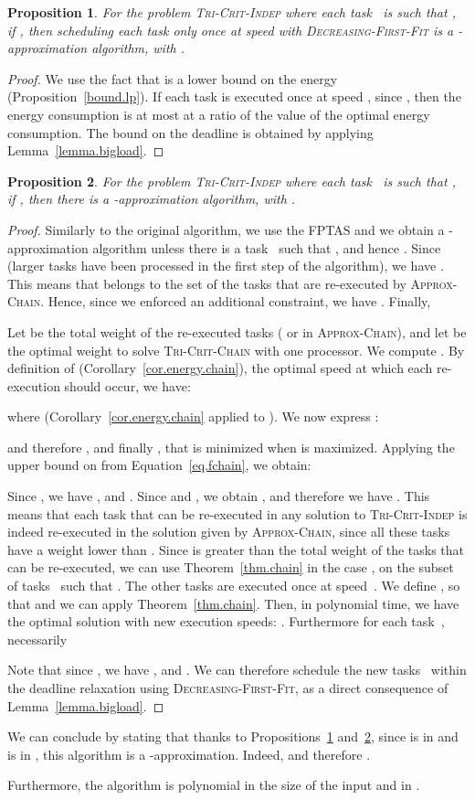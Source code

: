 \documentclass[a4paper]{article}
\theoremstyle{plain}
\newtheorem{proposition}{Proposition}
\theoremstyle{definition}
\theoremstyle{remark}
\newcommand{\dff}{\textsc{Dec\-reasing-First-Fit}\xspace}
\newcommand{\approxchain}{\textsc{Ap\-prox-Chain}}
\newcommand{\chain}{\textsc{Tri-Crit-Chain}\xspace}
\newcommand{\indep}{\textsc{Tri-Crit-In\-dep}\xspace}
\begin{document}
\begin{proposition}
 \label{prop.epsilon1}
 For the problem \indep where each task~ is such that
 , if  , then scheduling each
 task only once at speed  with \dff
 is a -approxi\-mation algorithm, with .
\end{proposition}

\begin{proof}
  We use the fact that  is a lower bound on the
  energy (Proposition~\ref{bound.lp}).  If each task is executed once
  at speed , since , then the energy consumption is
  at most at a ratio  of
  the value of the optimal energy consumption. 
  The bound on the deadline is obtained by applying
  Lemma~\ref{lemma.bigload}. 
\end{proof}


\begin{proposition}
\label{prop.2}
For the problem \indep where each task~ is such that
 , if , then there is a -approxi\-mation
 algorithm, with . 
\end{proposition}

\begin{proof}
  Similarly to the original algorithm, we use the FPTAS and we obtain
  a -approxi\-mation algorithm unless there is a task~ such
  that , and hence
  . Since  (larger
  tasks have been processed in the first step of the algorithm), we
  have .  This means that  belongs to the
  set of the tasks that are re-executed by \approxchain.  Hence, since
  we enforced an additional constraint, we have
  .  Finally,






Let  be the total weight of the re-executed tasks
( or  in \approxchain), and let  be the optimal weight to solve \chain with one processor. 
We compute .  By
definition of  (Corollary~\ref{cor.energy.chain}), the optimal
speed at which each re-execution should occur, we have:

where  (Corollary~\ref{cor.energy.chain} 
applied to ). We now express : 

and therefore 
,
and finally , 
that is minimized when  is maximized. Applying the upper bound
on  from Equation~\eqref{eq.fchain}, we obtain:


Since , we have
 , and
. Since
 and , we obtain
, 
and therefore we have 
. This means that each task that can be
re-executed in any solution to \indep is indeed re-executed in the
solution given by \approxchain, since all these tasks have a weight
lower than . Since  is greater
than the total weight of the tasks that can be re-executed, we can use
Theorem~\ref{thm.chain} in the case , on the subset of
tasks~ such that . The other tasks
are executed once at speed~. We define , so that  and we can apply Theorem~\ref{thm.chain}.  Then, in polynomial
time, we have the optimal solution with new execution speeds:
.  Furthermore for each task~,
necessarily 

Note that since , we have , and
. We can
therefore schedule the new tasks~ within the deadline
relaxation using \dff, as a direct consequence of
Lemma~\ref{lemma.bigload}. \end{proof}



We can conclude by stating that thanks to
Propositions~\ref{prop.epsilon1} and~\ref{prop.2}, since
 is in  and  is in
, this algorithm is a
-approximation. 
Indeed,  and therefore
.  


Furthermore, the algorithm is polynomial in the size of the input and
in .
\end{document}
